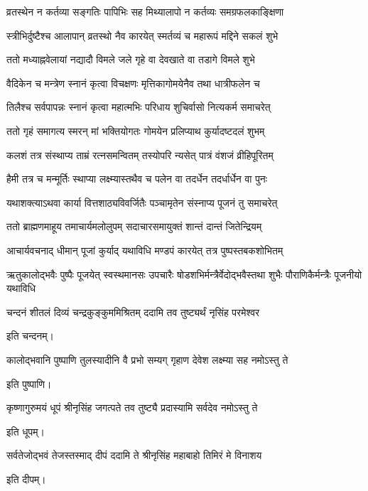 \twolineshloka
{व्रतस्थेन न कर्तव्या सङ्गतिः पापिभिः सह}
{मिथ्यालापो न कर्तव्यः समग्रफलकाङ्क्षिणा} %

\twolineshloka
{स्त्रीभिर्दुष्टैश्च आलापान् व्रतस्थो नैव कारयेत्}
{स्मर्तव्यं च महारूपं मद्दिने सकलं शुभे} %

\twolineshloka
{ततो मध्याह्नवेलायां नद्यादौ विमले जले}
{गृहे वा देवखाते वा तडागे विमले शुभे} %

\twolineshloka
{वैदिकेन च मन्त्रेण स्नानं कृत्वा विचक्षणः}
{मृत्तिकागोमयेनैव तथा धात्रीफलेन च} %

\twolineshloka
{तिलैश्च सर्वपापन्नः स्नानं कृत्वा महात्मभिः}
{परिधाय शुचिर्वासो नित्यकर्म समाचरेत्} %

\twolineshloka
{ततो गृहं समागत्य स्मरन् मां भक्तियोगतः}
{गोमयेन प्रलिप्याथ कुर्यादष्टदलं शुभम्} %

\twolineshloka
{कलशं तत्र संस्थाप्य ताम्रं रत्नसमन्वितम्}
{तस्योपरि न्यसेत् पात्रं वंशजं व्रीहिपूरितम्} %

\twolineshloka
{हैमी तत्र च मन्मूर्तिः स्थाप्या लक्ष्म्यास्तथैव च}
{पलेन वा तदर्धेन तदर्धार्धेन वा पुनः} %

\twolineshloka
{यथाशक्त्याऽथवा कार्या वित्तशाठ्यविवर्जितैः}
{पञ्चामृतेन संस्नाप्य पूजनं तु समाचरेत्} %

\twolineshloka
{ततो ब्राह्मणमाहूय तमाचार्यमलोलुपम्}
{सदाचारसमायुक्तं शान्तं दान्तं जितेन्द्रियम्} %

\twolineshloka
{आचार्यवचनाद् धीमान् पूजां कुर्याद् यथाविधि}
{मण्डपं कारयेत् तत्र पुष्पस्तबकशोभितम्} %

\threelineshloka
{ऋतुकालोद्भवैः पुष्पैः पूजयेत् स्वस्थमानसः}
{उपचारैः षोडशभिर्मन्त्रैर्वेदोद्भवैस्तथा} %
{शुभैः पौराणिकैर्मन्त्रैः पूजनीयो यथाविधि}

\twolineshloka
{चन्दनं शीतलं दिव्यं चन्द्रकुङ्कुममिश्रितम्}
{ददामि तव तुष्ट्यर्थं नृसिंह परमेश्वर} %

इति चन्दनम्।

\twolineshloka
{कालोद्भवानि पुष्पाणि तुलस्यादीनि वै प्रभो}
{सम्यग् गृहाण देवेश लक्ष्म्या सह नमोऽस्तु ते} %

इति पुष्पाणि।

\twolineshloka
{कृष्णागुरुमयं धूपं श्रीनृसिंह जगत्पते}
{तव तुष्ट्यै प्रदास्यामि सर्वदेव नमोऽस्तु ते} %

इति धूपम्।

\twolineshloka
{सर्वतेजोद्भवं तेजस्तस्माद् दीपं ददामि ते}
{श्रीनृसिंह महाबाहो तिमिरं मे विनाशय} %

इति दीपम्।

